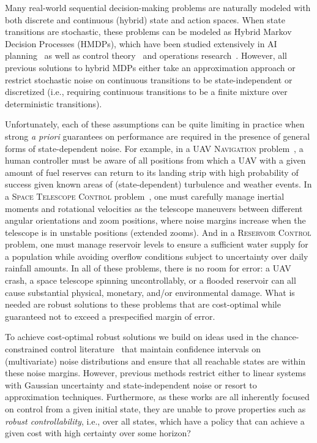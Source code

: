 \documentclass[letterpaper]{article}
\begin{document}
Many real-world sequential decision-making problems are naturally
modeled with both discrete and continuous (hybrid) state and action
spaces.  When state transitions are stochastic, these problems can be
modeled as Hybrid Markov Decision Processes (HMDPs), which have been
studied extensively in AI
planning~\cite{boyan01,feng04,li05,kveton06,phase07,hao09,sdp_aaai}
as well as control theory~\cite{Henzinger:1997,Hu:2000,DeSHee:2009}
and operations research~\cite{puterman}.  However, all previous
solutions to hybrid MDPs either take an approximation approach or
restrict stochastic noise on continuous transitions to be
state-independent or discretized (i.e., requiring continuous
transitions to be a finite mixture over deterministic transitions).

Unfortunately, each of these assumptions can be quite limiting in
practice when strong \emph{a priori} guarantees on performance are
required in the presence of general forms of state-dependent noise.
For example, in a \textsc{UAV Navigation} problem~\cite{Blackmore:2011}, a human
controller must be aware of all positions from which a UAV with a
given amount of fuel reserves can return to its landing strip with
high probability of success given known areas of (state-dependent)
turbulence and weather events.  In a \textsc{Space Telescope Control}
problem~\cite{DLohr:2012}, one must carefully manage inertial moments and
rotational velocities as the telescope maneuvers between different
angular orientations and zoom positions, where noise margins increase
when the telescope is in unstable positions (extended zooms).  And
in a \textsc{Reservoir Control} problem, one must manage
reservoir levels to ensure a sufficient water supply for a population
while avoiding overflow conditions subject to uncertainty over daily
rainfall amounts.  In all of these problems, there is no room for
error: a UAV crash, a space telescope spinning uncontrollably, or a
flooded reservoir can all cause substantial physical, monetary, and/or
environmental damage.  What is needed are robust solutions to these
problems that are cost-optimal while guaranteed not to exceed a
prespecified margin of error.

To achieve cost-optimal robust solutions we build on ideas
used in the chance-constrained control
literature~\cite{Schwarm:1999,Li:2002,Ono:2008,Blackmore:2011} that
maintain confidence intervals on (multivariate) noise distributions
and ensure that all reachable states are within these noise margins.
However, previous methods restrict either to linear systems with
Gaussian uncertainty and state-independent noise or resort
to approximation techniques.  Furthermore, as these works are all
inherently focused on control from a given initial state, they are
unable to prove properties such as \emph{robust controllability},
i.e., over all states, which have a policy that can achieve a given cost with
high certainty over some horizon?
\end{document}
